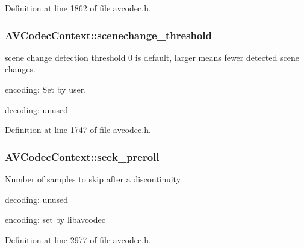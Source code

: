 Definition at line 1862 of file avcodec.\+h.

\subsubsection[{\texorpdfstring{scenechange\+\_\+threshold}{scenechange_threshold}}]{ A\+V\+Codec\+Context\+::scenechange\+\_\+threshold}\hypertarget{struct_a_v_codec_context_a5a01e9774060c41493c97d43b9737061}{}\label{struct_a_v_codec_context_a5a01e9774060c41493c97d43b9737061}
scene change detection threshold 0 is default, larger means fewer detected scene changes.
\begin{DoxyItemize}
\item encoding\+: Set by user.
\item decoding\+: unused 
\end{DoxyItemize}

Definition at line 1747 of file avcodec.\+h.

\subsubsection[{\texorpdfstring{seek\+\_\+preroll}{seek_preroll}}]{ A\+V\+Codec\+Context\+::seek\+\_\+preroll}\hypertarget{struct_a_v_codec_context_abbde5fb68f6f3dbaa570b37d4769e79f}{}\label{struct_a_v_codec_context_abbde5fb68f6f3dbaa570b37d4769e79f}
Number of samples to skip after a discontinuity
\begin{DoxyItemize}
\item decoding\+: unused
\item encoding\+: set by libavcodec 
\end{DoxyItemize}

Definition at line 2977 of file avcodec.\+h.

